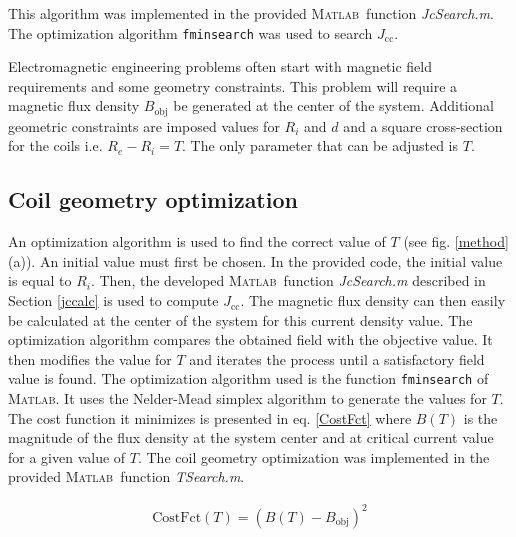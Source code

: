 \documentclass{ws-jmrr}
\newcommand{\MATLAB}{{\textsc{Matlab}}}
\begin{document}
\begin{multicols}{2}
This algorithm was implemented in the provided \MATLAB ~function \emph{JcSearch.m}. The optimization algorithm \texttt{fminsearch} was used to search $J_{\textrm{cc}}$.\par
Electromagnetic engineering problems often start with magnetic field requirements and some geometry constraints. 
This problem will require a magnetic flux density $B_{\textrm{obj}}$ be generated at the center of the system. Additional geometric constraints are imposed values for $R_i$ and $d$ and a square cross-section for the coils i.e. $R_e-R_i=T$. The only parameter that can be adjusted is $T$.\par

\subsection{Coil geometry optimization}
An optimization algorithm is used to find the correct value of $T$ (see fig. \ref{method} (a)). An initial value must first be chosen. In the provided code, the initial value is equal to $R_i$. Then, the developed \MATLAB ~function \emph{JcSearch.m} described in Section \ref{jccalc} is used to compute $J_{\textrm{cc}}$. The magnetic flux density can then easily be calculated at the center of the system for this current density value. The optimization algorithm compares the obtained field with the objective value. 
It then modifies the value for $T$ and iterates the process until a satisfactory field value is found. 
 The optimization algorithm used is the function \texttt{fminsearch} of \MATLAB. 
 It uses the Nelder-Mead simplex algorithm \cite{lagarias1998convergence} to generate the values for $T$. 
  The cost function it minimizes is presented in eq. \ref{CostFct} where $B(T)$ is the magnitude of the flux density at the system center and at critical current value for a given value of $T$. The coil geometry optimization was implemented in the provided \MATLAB ~function \emph{TSearch.m}.

\begin{align}
\textrm{CostFct}(T)=\left ( B(T)-B_{\textrm{obj}} \right )^{2}
\label{CostFct}
\end{align}


\end{multicols}
\end{document}
